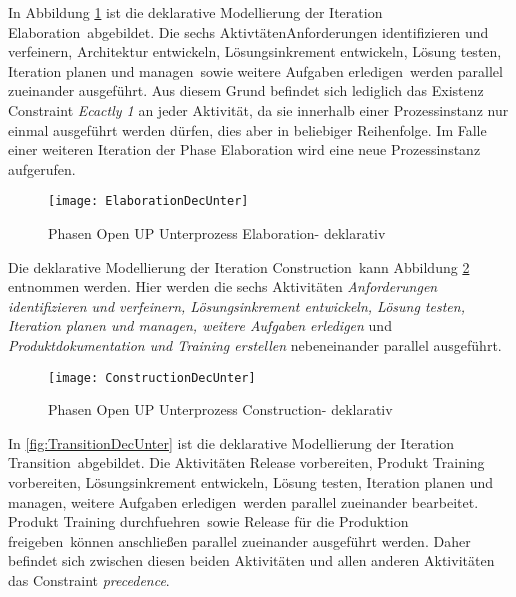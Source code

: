 In Abbildung \ref{fig:ElaborationDecUnter} ist die deklarative Modellierung der Iteration \grqq Elaboration\grqq \  abgebildet. Die sechs Aktivtäten\grqq Anforderungen identifizieren und verfeinern, Architektur entwickeln, Lösungsinkrement entwickeln, Lösung testen, Iteration planen und managen\grqq \ sowie \grqq weitere Aufgaben erledigen\grqq \ werden parallel zueinander ausgeführt. Aus diesem Grund befindet sich lediglich das Existenz Constraint \textit{Ecactly 1} an jeder Aktivität, da sie innerhalb einer Prozessinstanz nur einmal ausgeführt werden dürfen, dies aber in beliebiger Reihenfolge. Im Falle einer weiteren Iteration der Phase Elaboration wird eine neue Prozessinstanz aufgerufen. \newline

\begin{figure}[htp]
\begin{center}
  \texttt{[image: ElaborationDecUnter]} %
  \caption{Phasen Open UP Unterprozess Elaboration- deklarativ} 
  \label{fig:ElaborationDecUnter}
\end{center}
\end{figure}

Die deklarative Modellierung der Iteration \grqq Construction\grqq \  kann Abbildung \ref{fig:ConstructionDecUnter} entnommen werden. Hier werden die sechs Aktivitäten \textit{Anforderungen identifizieren und verfeinern, Lösungsinkrement entwickeln, Lösung testen, Iteration planen und managen, weitere Aufgaben erledigen} und \textit{Produktdokumentation und Training erstellen} nebeneinander parallel ausgeführt.
\begin{figure}[htp]
\begin{center}
  \texttt{[image: ConstructionDecUnter]} %
  \caption{Phasen Open UP Unterprozess Construction- deklarativ}
  \label{fig:ConstructionDecUnter}
\end{center}
\end{figure}

In \ref{fig:TransitionDecUnter} ist die deklarative Modellierung der Iteration \grqq Transition\grqq \  abgebildet.\newline
Die Aktivitäten \grqq Release vorbereiten, Produkt Training vorbereiten, Lösungsinkrement entwickeln, Lösung testen, Iteration planen und managen, weitere Aufgaben erledigen\grqq \ werden parallel zueinander bearbeitet. \grqq Produkt Training durchfuehren\grqq \   sowie \grqq Release für die Produktion freigeben\grqq \  können anschließen parallel zueinander ausgeführt werden. Daher befindet sich zwischen diesen beiden Aktivitäten und allen anderen Aktivitäten das Constraint \textit{precedence}.

